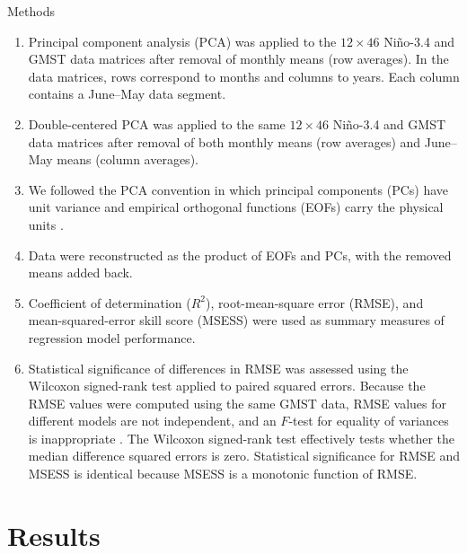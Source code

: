 \documentclass[aspectratio=169,xcolor=dvipsnames]{beamer}
\begin{document}
\begin{frame}{Methods}
  \begin{enumerate}\tiny

  \item Principal component analysis (PCA) was applied to the
    $12 \times 46$ Ni\~no-3.4 and GMST data matrices after removal of
    monthly means (row averages). In the data matrices, rows
    correspond to months and columns to years. Each column contains a
    June--May data segment.
    
  \item Double-centered PCA was applied to the same $12 \times 46$
    Ni\~no-3.4 and GMST data matrices after removal of both monthly
    means (row averages) and June--May means (column averages).

  \item We followed the PCA convention in which principal components
    (PCs) have unit variance and empirical orthogonal functions (EOFs)
    carry the physical units \citep{DelsoleTippettBook}.

\item Data were reconstructed as the product of EOFs and PCs, with
  the removed means added back.

\item Coefficient of determination ($R^2$), root-mean-square error
  (RMSE), and mean-squared-error skill score (MSESS) were used as
  summary measures of regression model performance.

  \item Statistical significance of differences in RMSE was assessed
    using the Wilcoxon signed-rank test applied to paired squared
    errors. Because the RMSE values were computed using the same GMST
    data, RMSE values for different models are not independent, and an
    $F$-test for equality of variances is inappropriate
    \citep{TDS:Comparing:2014}. The Wilcoxon signed-rank test
    effectively tests whether the median difference squared errors is
    zero. Statistical significance for RMSE and MSESS is identical
    because MSESS is a monotonic function of RMSE.
    
  \end{enumerate}
\end{frame}

\section{Results}\label{sec:results}
\end{document}
